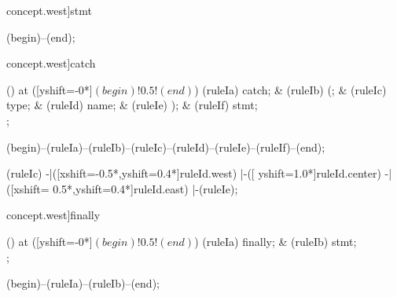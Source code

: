 \begin{syntax}[[xshift=22mm]concept.west]{stmt}
  
  \draw[path] (begin)--(end);
\end{syntax}

\begin{syntax}[[xshift=22mm]concept.west]{catch}
  
  \node[sequence,column sep=1.2cm] () at ([yshift=-0*\syntaxruledist]$(begin)!0.5!(end)$) {
    \node[terminal]    (ruleIa) {catch};
    &
    \node[terminal]    (ruleIb) {(};
    &
    \node[nonterminal] (ruleIc) {type};
    &
    \node[nonterminal] (ruleId) {name};
    &
    \node[terminal]    (ruleIe) {)};
    &
    \node[nonterminal] (ruleIf) {stmt};
    \\
  };
  
  \draw[path] (begin)--(ruleIa)--(ruleIb)--(ruleIc)--(ruleId)--(ruleIe)--(ruleIf)--(end);
  
  \draw[path] (ruleIc)
            -|([xshift=-0.5*\syntaxruledist,yshift=0.4*\syntaxruledist]ruleId.west)
            |-([                             yshift=1.0*\syntaxruledist]ruleId.center)
            -|([xshift= 0.5*\syntaxruledist,yshift=0.4*\syntaxruledist]ruleId.east)
            |-(ruleIe);
\end{syntax}

\begin{syntax}[[xshift=22mm]concept.west]{finally}
  
  \node[sequence,column sep=2.0cm] () at ([yshift=-0*\syntaxruledist]$(begin)!0.5!(end)$) {
    \node[terminal]    (ruleIa) {finally};
    &
    \node[nonterminal] (ruleIb) {stmt};
    \\
  };
  
  \draw[path] (begin)--(ruleIa)--(ruleIb)--(end);
\end{syntax}

